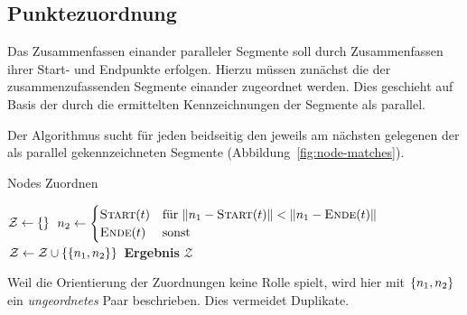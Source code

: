 \documentclass[../main/thesis.tex]{subfiles}
\begin{document}
\subsection{Punktezuordnung}
\label{ch:node-match-algorithm}

Das Zusammenfassen einander paralleler Segmente soll durch Zusammenfassen ihrer Start- und Endpunkte erfolgen.
Hierzu müssen zunächst die  der zusammenzufassenden Segmente einander zugeordnet werden.
Dies geschieht auf Basis der durch die  ermittelten Kennzeichnungen der Segmente als parallel.

Der Algorithmus  sucht für jeden  beidseitig den jeweils am nächsten gelegenen  der als parallel gekennzeichneten Segmente (Abbildung~\ref{fig:node-matches}).

\begin{algorithmhere}{Nodes Zuordnen}
\label{alg:Zuordnen}
\begin{algorithmic}
	\State $\mathcal{Z} \gets \{\}$
				\State $n_2 \gets \begin{cases}\textproc{Start}(t) & \text{für } \abs n_1 - \textproc{Start}(t)\abs < \abs n_1 - \textproc{Ende}(t)\abs\\\textproc{Ende}(t) & \text{sonst}\end{cases}$
				\State $\mathcal{Z} \gets \mathcal{Z} \cup \{\{n_1, n_2\}\}$
			\EndFor
		\EndFor
	\EndFor
	\State \textbf{Ergebnis} $\mathcal{Z}$
\EndFunction
\end{algorithmic}
\end{algorithmhere}

Weil die Orientierung der Zuordnungen keine Rolle spielt, wird hier mit $\{n_1, n_2\}$ ein \emph{ungeordnetes} Paar beschrieben.
Dies vermeidet Duplikate.

\end{document}
